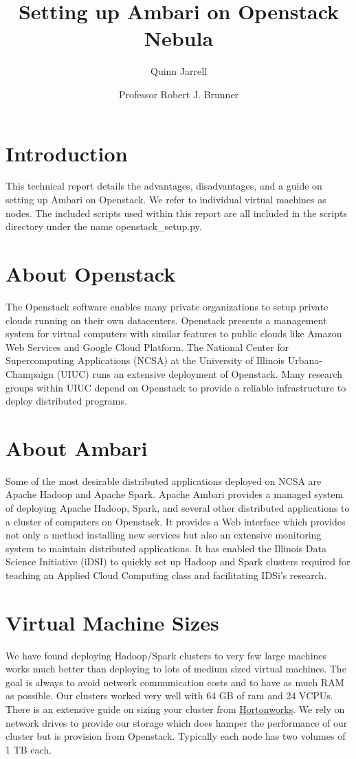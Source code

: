 \documentclass[9pt,twocolumn,twoside]{idsi}
\author[1]{Quinn Jarrell}
\author[2]{Professor Robert J. Brunner}
\affil[1]{National Center For Supercomputing Applications (NCSA)}
\affil[2]{Laboratory for Computation, Data, and Machine Learning}
\title{Setting up Ambari on Openstack Nebula}
\begin{document}

\maketitle

\section{Introduction}
This technical report details the advantages, disadvantages, and a guide on setting up Ambari on Openstack. We refer to individual virtual machines as nodes. The included scripts used within this report are all included in the scripts directory under the name openstack\_setup.py. 

\section{About Openstack}
The Openstack software enables many private organizations to setup private clouds running on their own datacenters. Openstack presents a management system for virtual computers with similar features to public clouds like Amazon Web Services and Google Cloud Platform. The National Center for Supercomputing Applications (NCSA) at the University of Illinois Urbana-Champaign (UIUC) runs an extensive deployment of Openstack. Many research groups within UIUC depend on Openstack to provide a reliable infrastructure to deploy distributed programs.

\section{About Ambari}
Some of the most desirable distributed applications deployed on NCSA are Apache Hadoop and Apache Spark. Apache Ambari provides a managed system of deploying Apache Hadoop, Spark, and several other distributed applications to a cluster of computers on Openstack. It provides a Web interface which provides not only a method installing new services but also an extensive monitoring system to maintain distributed applications. It has enabled the Illinois Data Science Initiative (iDSI) to quickly set up Hadoop and Spark clusters required for teaching an Applied Cloud Computing class and facilitating IDSi's research.

\section{Virtual Machine Sizes}
We have found deploying Hadoop/Spark clusters to very few large machines works much better than deploying to lots of medium sized virtual machines. The goal is always to avoid network communication costs and to have as much RAM as possible. Our clusters worked very well with 64 GB of ram and 24 VCPUs. There is an extensive guide on sizing your cluster from \href{https://docs.hortonworks.com/HDPDocuments/HDP2/HDP-2.3.0/bk_cluster-planning-guide/bk_cluster-planning-guide-20150721.pdf}{Hortonworks}. We rely on network drives to provide our storage which does hamper the performance of our cluster but is provision from Openstack. Typically each node has two volumes of 1 TB each.
\end{document}
